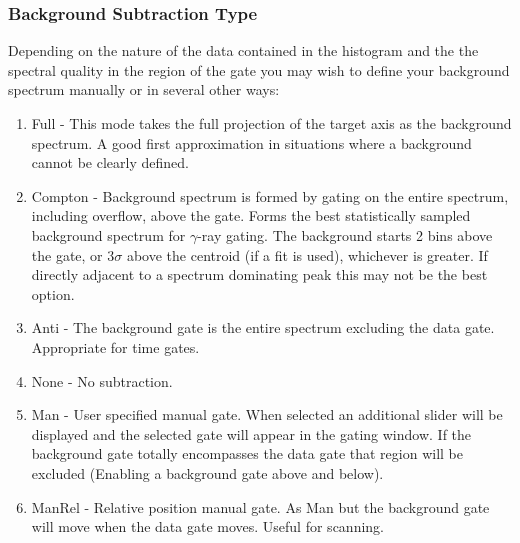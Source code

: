\documentclass[a4paper,10pt]{article}
\begin{document}
\begin{enumerate}
\centering{}

\end{enumerate}

\subsubsection{Background Subtraction Type}\label{sec:subtype}
Depending on the nature of the data contained in the histogram and the the spectral quality in the region of the gate you may wish to define your background spectrum manually or in several other ways:
\begin{enumerate}
\item Full - This mode takes the full projection of the target axis as the background spectrum. A good first approximation in situations where a background cannot be clearly defined.
\item Compton - Background spectrum is formed by gating on the entire spectrum, including overflow, above the gate. Forms the best statistically sampled background spectrum for $\gamma$-ray gating. The background starts 2 bins above the gate, or 3$\sigma$ above the centroid (if a fit is used), whichever is greater. If directly adjacent to a spectrum dominating peak this may not be the best option. 
\item Anti - The background gate is the entire spectrum excluding the data gate. Appropriate for time gates.
\item None - No subtraction.
\item Man - User specified manual gate. When selected an additional slider will be displayed and the selected gate will appear in the gating window. If the background gate totally encompasses the data gate that region will be excluded (Enabling a background gate above and below).
\item ManRel - Relative position manual gate. As Man but the background gate will move when the data gate moves. Useful for scanning.
\end{enumerate}
\end{document}

